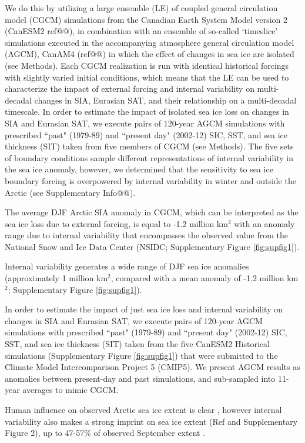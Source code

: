 \documentclass{nature}
\begin{document}
We do this by utilizing a large ensemble (LE) of coupled general circulation model (CGCM) simulations from the Canadian Earth System Model version 2 (CanESM2 ref@@), in combination with an ensemble of so-called `timeslice' simulations executed in the accompanying atmosphere general circulation model (AGCM), CanAM4 (ref@@) in which the effect of changes in sea ice are isolated (see Methods). Each CGCM realization is run with identical historical forcings with slightly varied initial conditions, which means that the LE can be used to characterize the impact of external forcing and internal variability on multi-decadal changes in SIA, Eurasian SAT, and their relationship on a multi-decadal timescale. In order to estimate the impact of isolated sea ice loss on changes in SIA and Eurasian SAT, we execute pairs of 120-year AGCM simulations with prescribed ``past" (1979-89) and ``present day" (2002-12) SIC, SST, and sea ice thickness (SIT) taken from five members of CGCM (see Methods). The five sets of boundary conditions sample different representations of internal variability in the sea ice anomaly, however, we determined that the sensitivity to sea ice boundary forcing is overpowered by internal variability in winter and outside the Arctic (see Supplementary Info@@). %

The average DJF Arctic SIA anomaly in CGCM, which can be interpreted as the sea ice loss due to external forcing, is equal to -1.2 million km$^2$ with an anomaly range due to internal variability that encompasses the observed value from the National Snow and Ice Data Center (NSIDC; Supplementary Figure \ref{fig:supfig1}).


Internal variability generates a wide range of DJF sea ice anomalies (approximately 1 million km$^2$, compared with a mean anomaly of -1.2 million km$^2$; Supplementary Figure \ref{fig:supfig1}).

In order to estimate the impact of just sea ice loss and internal variability on changes in SIA and Eurasian SAT, we execute pairs of 120-year AGCM simulations with prescribed ``past" (1979-89) and ``present day" (2002-12) SIC, SST, and sea ice thickness (SIT) taken from the five CanESM2 Historical simulations (Supplementary Figure \ref{fig:supfig1}) that were submitted to the Climate Model Intercomparison Project 5 (CMIP5). We present AGCM results as anomalies between present-day and past simulations, and sub-sampled into 11-year averages to mimic CGCM.



Human influence on observed Arctic sea ice extent is clear \cite{min08}, however internal variability also makes a strong imprint on sea ice extent (Ref \cite{swart15} and Supplementary Figure 2), up to 47-57\% of observed September extent \cite{stroeve07,kay11}.
\end{document}
